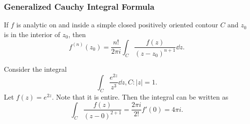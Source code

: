 \documentclass[../notes.tex]{subfiles}
\begin{document}
\subsubsection{Generalized Cauchy Integral Formula}
\begin{theorem}
    \label{thm:generalizedcif}
    If $f$ is analytic on and inside a simple closed positively oriented contour $C$ and $z_0$ is in the interior of $z_0$, then
    \[
        f^{(n)}(z_0) = \frac{n!}{2 \pi i} \int_C \frac{f(z)}{(z - z_0)^{n+1}} \dd z
    .\]
\end{theorem}

\begin{example}
    Consider the integral
    \[
        \int_C \frac{e^{2z}}{z^3} \dd z, C : |z| = 1
    .\]
    Let $f(z) = e^{2z}$. Note that it is entire. Then the integral can be written as
    \[
        \int_C \frac{f(z)}{(z - 0)^{2 + 1}} = \frac{2 \pi i}{2!} f'(0) = 4 \pi i
    .\]
\end{example}
\end{document}
